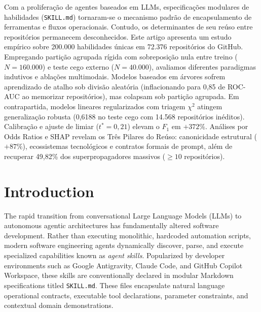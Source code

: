 \documentclass[12pt]{article}
\begin{document}
\begin{resumo}
Com a prolifera{\c{c}}{\~a}o de agentes baseados em LLMs, especifica{\c{c}}{\~o}es modulares de habilidades (\texttt{SKILL.md}) tornaram-se o mecanismo padr{\~a}o de encapsulamento de ferramentas e fluxos operacionais. Contudo, os determinantes de seu re{\'u}so entre reposit{\'o}rios permanecem desconhecidos. Este artigo apresenta um estudo emp{\'i}rico sobre 200.000 habilidades {\'u}nicas em 72.376 reposit{\'o}rios do GitHub. Empregando parti{\c{c}}{\~a}o agrupada r{\'i}gida com sobreposi{\c{c}}{\~a}o nula entre treino ($N=160.000$) e teste cego externo ($N=40.000$), avaliamos diferentes paradigmas indutivos e abla{\c{c}}{\~o}es multimodais. Modelos baseados em {\'a}rvores sofrem aprendizado de atalho sob divis{\~a}o aleat{\'o}ria (inflacionando para 0,85 de ROC-AUC ao memorizar reposit{\'o}rios), mas colapsam sob parti{\c{c}}{\~a}o agrupada. Em contrapartida, modelos lineares regularizados com triagem $\chi^2$ atingem generaliza{\c{c}}{\~a}o robusta (0,6188 no teste cego com 14.568 reposit{\'o}rios in{\'e}ditos). Calibra{\c{c}}{\~a}o e ajuste de limiar ($t^*=0,21$) elevam o $F_1$ em $+372\%$. An{\'a}lises por Odds Ratios e SHAP revelam os Tr{\^e}s Pilares do Re{\'u}so: canonicidade estrutural ($+87\%$), ecossistemas tecnol{\'o}gicos e contratos formais de prompt, al{\'e}m de recuperar 49,82\% dos superpropagadores massivos ($\ge 10$ reposit{\'o}rios).
\end{resumo}

\section{Introduction}

The rapid transition from conversational Large Language Models (LLMs) to autonomous agentic architectures has fundamentally altered software development. Rather than executing monolithic, hardcoded automation scripts, modern software engineering agents dynamically discover, parse, and execute specialized capabilities known as \emph{agent skills}. Popularized by developer environments such as Google Antigravity, Claude Code, and GitHub Copilot Workspace, these skills are conventionally declared in modular Markdown specifications titled \texttt{SKILL.md}. These files encapsulate natural language operational contracts, executable tool declarations, parameter constraints, and contextual domain demonstrations.
\end{document}
